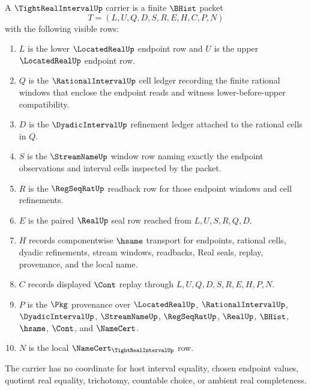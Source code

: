 \begin{definition}
\label{def:tight-real-interval-carrier}
A $\TightRealIntervalUp$ carrier is a finite $\BHist$ packet
$$
T=(L,U,Q,D,S,R,E,H,C,P,N)
$$
with the following visible rows:
\begin{enumerate}
\item $L$ is the lower $\LocatedRealUp$ endpoint row and $U$ is the upper $\LocatedRealUp$ endpoint row.
\item $Q$ is the $\RationalIntervalUp$ cell ledger recording the finite rational windows that enclose the endpoint reads and witness lower-before-upper compatibility.
\item $D$ is the $\DyadicIntervalUp$ refinement ledger attached to the rational cells in $Q$.
\item $S$ is the $\StreamNameUp$ window row naming exactly the endpoint observations and interval cells inspected by the packet.
\item $R$ is the $\RegSeqRatUp$ readback row for those endpoint windows and cell refinements.
\item $E$ is the paired $\RealUp$ seal row reached from $L,U,S,R,Q,D$.
\item $H$ records componentwise $\hsame$ transport for endpoints, rational cells, dyadic refinements, stream windows, readbacks, Real seals, replay, provenance, and the local name.
\item $C$ records displayed $\Cont$ replay through $L,U,Q,D,S,R,E,H,P,N$.
\item $P$ is the $\Pkg$ provenance over $\LocatedRealUp$, $\RationalIntervalUp$, $\DyadicIntervalUp$, $\StreamNameUp$, $\RegSeqRatUp$, $\RealUp$, $\BHist$, $\hsame$, $\Cont$, and $\NameCert$.
\item $N$ is the local $\NameCert_{\TightRealIntervalUp}$ row.
\end{enumerate}
The carrier has no coordinate for host interval equality, chosen endpoint values, quotient real equality, trichotomy, countable choice, or ambient real completeness.
\end{definition}


